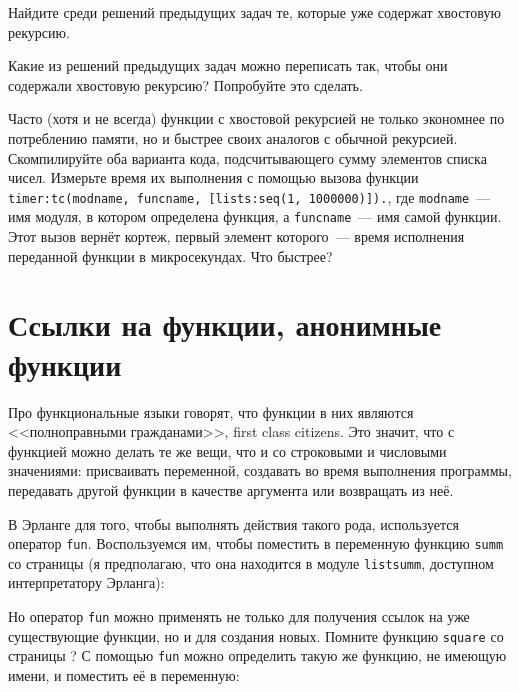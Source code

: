 \documentclass[
  paper=a4,
  fontsize=14pt,
  openany,
  appendixprefix=true
]{scrbook}
\begin{document}
\begin{problem}\label{already}
Найдите среди решений предыдущих задач те, которые уже содержат хвостовую рекурсию.
\end{problem}

\begin{problem}\label{tail}
Какие из решений предыдущих задач можно переписать так, чтобы они содержали хвостовую рекурсию? Попробуйте это сделать.
\end{problem}

\begin{problem}\label{timer}
Часто (хотя и не всегда) функции с хвостовой рекурсией не только экономнее по потреблению памяти, но и быстрее своих аналогов с обычной рекурсией. Скомпилируйте оба варианта кода, подсчитывающего сумму элементов списка чисел. Измерьте время их выполнения с помощью вызова функции \lstinline{timer:tc(modname, funcname, [lists:seq(1, 1000000)]).}, где \lstinline{modname}~--- имя модуля, в котором определена функция, а \lstinline{funcname}~--- имя самой функции. Этот вызов вернёт кортеж, первый элемент которого~--- время исполнения переданной функции в микросекундах. Что быстрее?
\end{problem}

\section{Ссылки на функции, анонимные функции}
\label{firstClassCitizens}

Про функциональные языки говорят, что функции в них являются <<полноправными гражданами>>, first class citizens. Это значит, что с функцией можно делать те же вещи, что и со строковыми и числовыми значениями: присваивать переменной, создавать во время выполнения программы, передавать другой функции в качестве аргумента или возвращать из неё.

В Эрланге для того, чтобы выполнять действия такого рода, используется оператор \lstinline{fun}. Воспользуемся им, чтобы поместить в переменную функцию \lstinline{summ} со страницы \pageref{listsumm} (я предполагаю, что она находится в модуле \lstinline{listsumm}, доступном интерпретатору Эрланга):


Но оператор \lstinline{fun} можно применять не только для получения ссылок на уже существующие функции, но и для создания новых. Помните функцию \lstinline{square} со страницы \pageref{square}? С помощью \lstinline{fun} можно определить такую же функцию, не имеющую имени, и поместить её в переменную:
\end{document}
